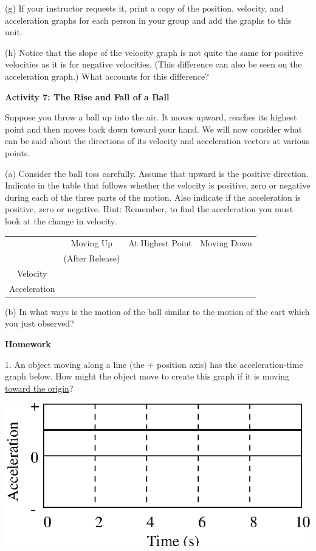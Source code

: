 (g) If your instructor requests it, print a copy of the position, velocity, and acceleration graphs for each person in your group and add the graphs to this unit.

(h) Notice that the slope of the velocity graph is not quite the same for positive velocities as it is for negative velocities. (This difference can also be seen on the acceleration graph.) What accounts for this difference?
\answerspace{20mm}

\textbf{Activity 7: The Rise and Fall of a Ball} 

Suppose you throw a ball up into the air. It moves upward, reaches its highest
point and then moves back down toward your hand. We will now consider what can be said about the directions of its velocity and acceleration vectors at various points.

(a) Consider the ball toss carefully. Assume that upward is the positive direction.
Indicate in the table that follows whether the velocity is positive, zero or
negative during each of the three parts of the motion. Also indicate if the
acceleration is positive, zero or negative. Hint: Remember, to find the acceleration
you must look at the change in velocity.

\vspace{0.3cm}
{\centering \begin{tabular}{|c|c|c|c|}
\hline 
&
Moving Up&
At Highest Point&
Moving Down\\
&
(After Release)&
&
\\
\hline 
Velocity&
&
&
\\
\hline 
Acceleration&
&
&
\\
\hline 
\end{tabular}\par}
\vspace{0.3cm}

(b) In what ways is the motion of the ball similar to the motion of the cart
which you just observed?
\answerspace{10mm}

\pagebreak[3]
\textbf{Homework} 

1. An object moving along a line (the + position axis) has the acceleration-time graph below. How might the object move to create this graph if it is moving
\underline{toward the origin}?

\vspace{0.3cm}
{\par\centering \includegraphics{slowing/slowing_fig6.eps} \par}
\vspace{0.3cm}

